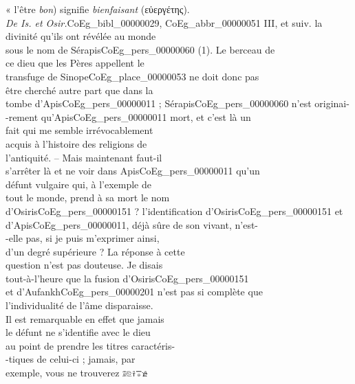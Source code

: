 \documentclass{book}
\begin{document}
{\begin{paracol}{2}
« l’être \textit{bon}) signifie \textit{bienfaisant} (εὐεργέτης).\\
\textit{De Is. et Osir.}\gls{CoEg_bibl_00000029}, \gls{CoEg_abbr_00000051} III, et suiv.
\switchcolumn
\noindent la divinité qu’ils ont révélée au monde\\
sous le nom de Sérapis\gls{CoEg_pers_00000060} (1). Le berceau de\\
ce dieu que les Pères appellent le\\
transfuge de Sinope\gls{CoEg_place_00000053} ne doit donc pas\\
être cherché autre part que dans la\\
tombe d’Apis\gls{CoEg_pers_00000011} ; Sérapis\gls{CoEg_pers_00000060} n’est originai-\\
-rement qu’Apis\gls{CoEg_pers_00000011} mort, et c’est là un\\
fait qui me semble irrévocablement\\
acquis à l’histoire des religions de\\
l’antiquité. – Mais maintenant faut-il\\
s’arrêter là et ne voir dans Apis\gls{CoEg_pers_00000011} qu’un\\
défunt vulgaire qui, à l’exemple de\\
tout le monde, prend à sa mort le nom\\
d’Osiris\gls{CoEg_pers_00000151} ? l’identification d’Osiris\gls{CoEg_pers_00000151} et\\
d’Apis\gls{CoEg_pers_00000011}, déjà sûre de son vivant, n’est-\\
-elle pas, si je puis m’exprimer ainsi,\\
d’un degré supérieure ? La réponse à cette\\
question n’est pas douteuse. Je disais\\
tout-à-l’heure que la fusion d’Osiris\gls{CoEg_pers_00000151}\\
et d’Aufankh\gls{CoEg_pers_00000201} n’est pas si complète que\\
l’individualité de l’âme disparaisse.\\
Il est remarquable en effet que jamais\\
le défunt ne s’identifie avec le dieu\\
au point de prendre les titres caractéris-\\
-tiques de celui-ci ; jamais, par\\
exemple, vous ne trouverez \includegraphics[height=6pt]{CoEg_Mariette_hiero_1857-04-01_18_1_1.png}\\

\end{paracol}}
\end{document}
